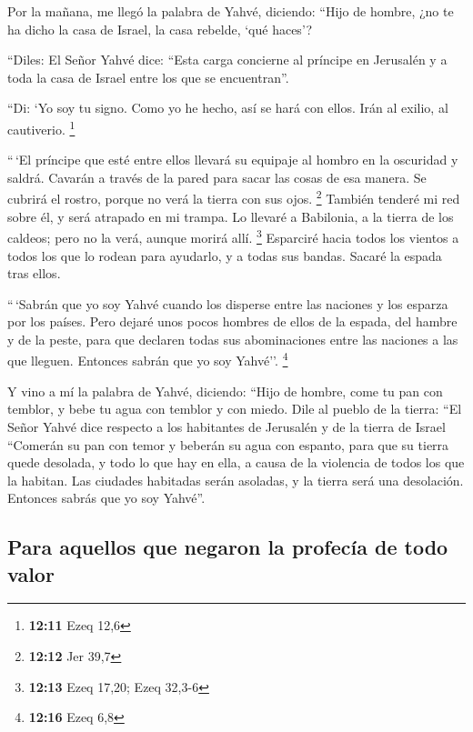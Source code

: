  Por la mañana, me llegó la palabra de Yahvé, diciendo:
 ``Hijo de hombre, ¿no te ha dicho la casa de Israel, la
casa rebelde, `qué haces'?

 ``Diles: El Señor Yahvé dice: ``Esta carga concierne al
príncipe en Jerusalén y a toda la casa de Israel entre los que se
encuentran''.

 ``Di: `Yo soy tu signo. Como yo he hecho, así se hará
con ellos. Irán al exilio, al cautiverio. \footnote{\textbf{12:11} Ezeq
  12,6}

 ``\,`El príncipe que esté entre ellos llevará su
equipaje al hombro en la oscuridad y saldrá. Cavarán a través de la
pared para sacar las cosas de esa manera. Se cubrirá el rostro, porque
no verá la tierra con sus ojos. \footnote{\textbf{12:12} Jer 39,7}
 También tenderé mi red sobre él, y será atrapado en mi
trampa. Lo llevaré a Babilonia, a la tierra de los caldeos; pero no la
verá, aunque morirá allí. \footnote{\textbf{12:13} Ezeq 17,20; Ezeq
  32,3-6}  Esparciré hacia todos los vientos a todos los
que lo rodean para ayudarlo, y a todas sus bandas. Sacaré la espada tras
ellos.

 ``\,`Sabrán que yo soy Yahvé cuando los disperse entre
las naciones y los esparza por los países.  Pero dejaré
unos pocos hombres de ellos de la espada, del hambre y de la peste, para
que declaren todas sus abominaciones entre las naciones a las que
lleguen. Entonces sabrán que yo soy Yahvé''. \footnote{\textbf{12:16}
  Ezeq 6,8}

 Y vino a mí la palabra de Yahvé, diciendo:
 ``Hijo de hombre, come tu pan con temblor, y bebe tu
agua con temblor y con miedo.  Dile al pueblo de la
tierra: ``El Señor Yahvé dice respecto a los habitantes de Jerusalén y
de la tierra de Israel ``Comerán su pan con temor y beberán su agua con
espanto, para que su tierra quede desolada, y todo lo que hay en ella, a
causa de la violencia de todos los que la habitan.  Las
ciudades habitadas serán asoladas, y la tierra será una desolación.
Entonces sabrás que yo soy Yahvé''.

\hypertarget{para-aquellos-que-negaron-la-profecuxeda-de-todo-valor}{%
\subsection{Para aquellos que negaron la profecía de todo
valor}\label{para-aquellos-que-negaron-la-profecuxeda-de-todo-valor}}

